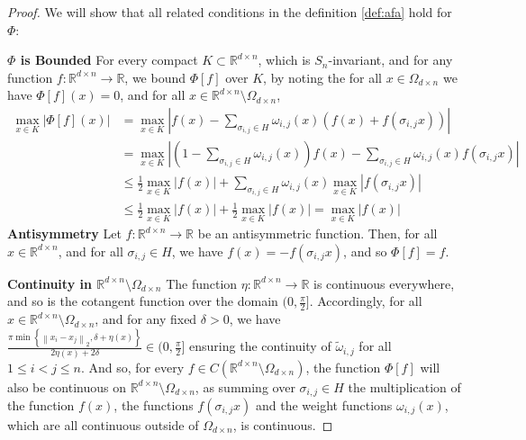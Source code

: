 \documentclass{amsart}
\theoremstyle{plain}
\theoremstyle{definition}
\theoremstyle{remark}
\newcommand{\RR}{\mathbb{R}}
\newcommand{\abs}[1]{\left\lvert#1\right\rvert}
\begin{document}
\begin{proof}
	 We will show that all related conditions in the definition \ref{def:afa} hold for $\Phi$:
	 
	\textbf{$\Phi$ is Bounded} 
For every compact $K \subset \RR^{d \times n}$, which is $S_n$-invariant, and for any function $f: \RR^{d \times n} \to \RR$, we bound $\Phi[f]$ over $K$, by noting the for all $x \in  \Omega_{d\times n}$ we have $\Phi[f](x)=0 $, and for all $x \in \RR^{d\times n}\setminus \Omega_{d\times n}$,	
\begin{equation}
		\begin{split}
			\max_{x \in K}{\abs{\Phi[f](x)}} 
            &= 
			\max_{x \in K}{\abs{f(x) - \sum_{\sigma_{i,j} \in H}{\omega_{i,j}(x)\left(f(x) + f(\sigma_{i,j} x) \right)}}}
			\\
			&=
			\max_{x \in K}{\abs{\left(1 - \sum_{\sigma_{i,j} \in H}{\omega_{i, j}(x)}\right)f(x) - \sum_{\sigma_{i,j} \in H}{\omega_{i,j}(x) f(\sigma_{i,j} x)}}}
			\\
			&\leq 
			\frac{1}{2}\max_{x \in K}{\abs{f(x)}} + \sum_{\sigma_{i,j} \in H}{\omega_{i,j}(x) \max_{x \in K}{\abs{f(\sigma_{i,j} x)}}}
			\\
			&\leq \frac{1}{2}\max_{x \in K}{\abs{f(x)}} + \frac{1}{2}\max_{x \in K}{\abs{f(x)}} = \max_{x \in K}{\abs{f(x)}}
		\end{split}
	\end{equation} 
	\textbf{Antisymmetry}
	  Let $f:\RR^{d\times n}\to \RR$ be an antisymmetric function. Then, for all $x \in \RR^{d \times n}$, and for all $\sigma_{i,j} \in H$, we have $f(x) = -f(\sigma_{i,j} x)$, and so $\Phi[f] = f$. 
	
	\textbf{Continuity in $\RR^{d\times n}\setminus \Omega_{d\times n}$} The function $\eta: \RR^{d \times n} \to \RR$ is continuous everywhere, and so is the cotangent function over the domain $(0, \frac{\pi}{2}]$. Accordingly, for all $x \in \RR^{d \times n} \setminus{\Omega_{d \times n}}$, and for any fixed $\delta > 0$, we have $\frac{\pi\min{\left\{\left\| x_i - x_j \right\|_2, \delta + \eta(x) \right\}}}{2\eta(x) + 2\delta} \in (0, \frac{\pi}{2}]$ ensuring the continuity of $\tilde{\omega}_{i, j}$ for all $1 \leq i < j \leq n$. And so, for every $f\in  C\left(\RR^{d \times n} \setminus \Omega_{d\times n} \right)$, the function $\Phi[f]$ will also be continuous on $\RR^{d\times n}\setminus \Omega_{d\times n} $, as summing over $\sigma_{i, j} \in H$ the multiplication of the function $f(x)$, the functions $f(\sigma_{i,j}x)$ and the weight functions $\omega_{i,j}(x)$, which are all continuous outside of $\Omega_{d \times n}$, is continuous.
	

\end{proof}
\end{document}
